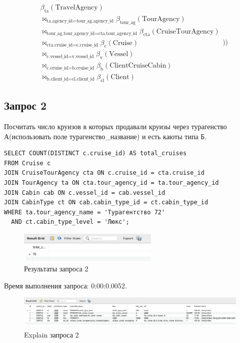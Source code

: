 \documentclass[11pt,a4paper,final]{article}
\begin{document}
$$
  \begin{aligned}
    &\beta_{\text{ta}}(\text{TravelAgency}) \\
    &\bowtie_{\text{ta.agency\_id} = \text{tour\_ag.agency\_id}} \beta_{\text{tour\_ag}}(\text{TourAgency}) \\
    &\bowtie_{\text{tour\_ag.tour\_agency\_id} = \text{cta.tour\_agency\_id}} \beta_{\text{cta}}(\text{CruiseTourAgency}) \\
    &\bowtie_{\text{cta.cruise\_id} = \text{c.cruise\_id}} \beta_{\text{c}}(\text{Cruise}) \\
    &\bowtie_{\text{c.vessel\_id} = \text{v.vessel\_id}} \beta_{\text{v}}(\text{Vessel}) \\
    &\bowtie_{\text{c.cruise\_id} = \text{b.cruise\_id}} \beta_{\text{b}}(\text{ClientCruiseCabin}) \\
    &\bowtie_{\text{b.client\_id} = \text{cl.client\_id}} \beta_{\text{cl}}(\text{Client})
  \end{aligned} \Bigg) \Bigg)
$$

\subsection{Запрос 2}
Посчитать число круизов в которых продавали круизы через турагенство А(использовать поле турагенство\_название) и есть каюты типа Б.
\begin{lstlisting}[style=sqlstyle, label=sql:query1]
SELECT COUNT(DISTINCT c.cruise_id) AS total_cruises
FROM Cruise c
JOIN CruiseTourAgency cta ON c.cruise_id = cta.cruise_id
JOIN TourAgency ta ON cta.tour_agency_id = ta.tour_agency_id
JOIN Cabin cab ON c.vessel_id = cab.vessel_id
JOIN CabinType ct ON cab.cabin_type_id = ct.cabin_type_id
WHERE ta.tour_agency_name = 'Турагентство 72' 
  AND ct.cabin_type_level = 'Люкс'; 
\end{lstlisting}
\begin{figure}[h!]
    \centering
    \includegraphics[width=0.6\textwidth]{12.png} 
    \caption{Результаты запроса 2}
\end{figure}
{\centering
Время выполнения запроса: 0:00:0.0052.\par}
\begin{figure}[H]
    \centering
    \includegraphics[width=\textwidth]{13.png} 
    \caption{Explain запроса 2}
\end{figure}
\end{document}

